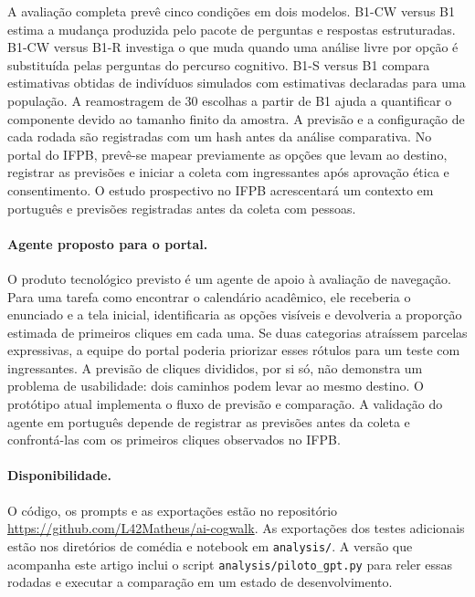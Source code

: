 \documentclass[12pt]{article}
\begin{document}
A avaliação completa prevê cinco condições em dois modelos. B1-CW versus B1 estima a mudança produzida pelo pacote de perguntas e respostas estruturadas. B1-CW versus B1-R investiga o que muda quando uma análise livre por opção é substituída pelas perguntas do percurso cognitivo. B1-S versus B1 compara estimativas obtidas de indivíduos simulados com estimativas declaradas para uma população. A reamostragem de 30 escolhas a partir de B1 ajuda a quantificar o componente devido ao tamanho finito da amostra. A previsão e a configuração de cada rodada são registradas com um hash antes da análise comparativa. No portal do IFPB, prevê-se mapear previamente as opções que levam ao destino, registrar as previsões e iniciar a coleta com ingressantes após aprovação ética e consentimento. O estudo prospectivo no IFPB acrescentará um contexto em português e previsões registradas antes da coleta com pessoas.

\paragraph{Agente proposto para o portal.} O produto tecnológico previsto é um agente de apoio à avaliação de navegação. Para uma tarefa como encontrar o calendário acadêmico, ele receberia o enunciado e a tela inicial, identificaria as opções visíveis e devolveria a proporção estimada de primeiros cliques em cada uma. Se duas categorias atraíssem parcelas expressivas, a equipe do portal poderia priorizar esses rótulos para um teste com ingressantes. A previsão de cliques divididos, por si só, não demonstra um problema de usabilidade: dois caminhos podem levar ao mesmo destino. O protótipo atual implementa o fluxo de previsão e comparação. A validação do agente em português depende de registrar as previsões antes da coleta e confrontá-las com os primeiros cliques observados no IFPB.

\paragraph{Disponibilidade.} O código, os prompts e as exportações estão no repositório \url{https://github.com/L42Matheus/ai-cogwalk}. As exportações dos testes adicionais estão nos diretórios de comédia e notebook em \texttt{analysis/}. A versão que acompanha este artigo inclui o script \texttt{analysis/piloto\_gpt.py} para reler essas rodadas e executar a comparação em um estado de desenvolvimento.



\end{document}
